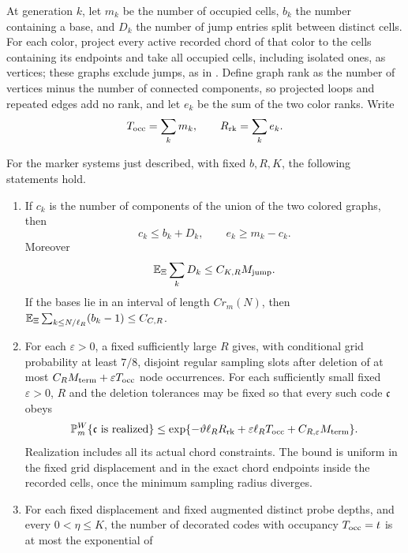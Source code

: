 At generation \(k\), let \(m_k\) be the number of occupied cells,
\(b_k\) the number containing a base, and \(D_k\) the number of jump
entries split between distinct cells.  For each color, project every
active recorded chord of that color to the cells containing its endpoints and take
all occupied cells, including isolated ones, as vertices; these graphs
exclude jumps, as in \cite[Definition~10.6 and Lemma~10.7]{P}.
Define graph rank as the number of vertices minus the number of
connected components, so projected loops and repeated edges add no
rank, and let \(e_k\) be the sum of the two color ranks.  Write
\[
 T_{\rm occ}=\sum_k m_k,\qquad R_{\rm rk}=\sum_k e_k.
\]

\begin{proposition}
\label{prop:address-input}
For the marker systems just described, with fixed \(b,R,K\), the
following statements hold.
\begin{enumerate}[label=(\roman*)]
\item If \(c_k\) is the number of components of the union of the
two colored graphs, then
\[
 c_k\le b_k+D_k,\qquad e_k\ge m_k-c_k.
\]
Moreover
\[
 \mathbb E_\Xi\sum_kD_k\le C_{K,R}M_{\rm jump}.
\]
If the bases lie in an interval of length \(C r_m(N)\), then
\(\mathbb E_\Xi\sum_{k\le N/\ell_R}(b_k-1)\le C_{C,R}\).
\item For each \(\varepsilon>0\), a fixed sufficiently large \(R\)
gives, with conditional grid probability at least \(7/8\), disjoint
regular sampling slots after deletion of at most
\(C_RM_{\rm term}+\varepsilon T_{\rm occ}\) node occurrences.
For each sufficiently small fixed \(\varepsilon>0\), \(R\) and
the deletion tolerances may be fixed so that every such code
\(\mathfrak c\) obeys
\begin{equation}
\label{eq:fixed-code-charge}
 \mathbb P_m^W\{\mathfrak c\text{ is realized}\}
 \le
 \exp\{-\vartheta\ell_R R_{\rm rk}
       +\varepsilon\ell_R T_{\rm occ}
       +C_{R,\varepsilon}M_{\rm term}\}.
\end{equation}
Realization includes all its actual chord constraints.  The bound
is uniform in the fixed grid displacement and in the exact
chord endpoints inside the recorded cells, once the minimum
sampling radius diverges.
\item For each fixed displacement and fixed augmented distinct
probe depths, and every \(0<\eta\le K\), the number of decorated codes with
occupancy \(T_{\rm occ}=t\) is at most the exponential of
\begin{equation}
\label{eq:address-count}

\end{equation}
\end{enumerate}
\end{proposition}
